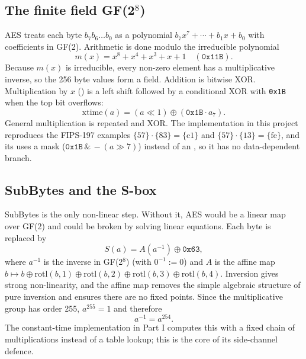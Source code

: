 \subsection{The finite field GF(2\texorpdfstring{$^8$}{8})}

AES treats each byte $b_7 b_6\ldots b_0$ as a polynomial $b_7x^7 + \cdots + b_1x + b_0$ with coefficients in GF(2). Arithmetic is done modulo the irreducible polynomial
\begin{equation}
m(x) = x^8 + x^4 + x^3 + x + 1 \quad (\texttt{0x11B}).
\end{equation}
Because $m(x)$ is irreducible, every non-zero element has a multiplicative inverse, so the 256 byte values form a field. Addition is bitwise XOR. Multiplication by $x$ () is a left shift followed by a conditional XOR with \texttt{0x1B} when the top bit overflows:
\begin{equation}
\mathrm{xtime}(a) = (a \ll 1) \oplus (\texttt{0x1B}\cdot a_7).
\end{equation}
General multiplication is repeated  and XOR. The implementation in this project reproduces the FIPS-197 examples $\{57\}\cdot\{83\} = \{\mathrm{c1}\}$ and $\{57\}\cdot\{13\} = \{\mathrm{fe}\}$, and its  uses a mask ($\texttt{0x1B}\,\&\,{-}(a \gg 7)$) instead of an , so it has no data-dependent branch.

\subsection{SubBytes and the S-box}

SubBytes is the only non-linear step. Without it, AES would be a linear map over GF(2) and could be broken by solving linear equations. Each byte is replaced by
\begin{equation}
S(a) = A\!\left(a^{-1}\right) \oplus \texttt{0x63},
\label{eq:sbox}
\end{equation}
where $a^{-1}$ is the inverse in GF(2$^8$) (with $0^{-1} := 0$) and $A$ is the affine map $b \mapsto b \oplus \mathrm{rotl}(b,1) \oplus \mathrm{rotl}(b,2) \oplus \mathrm{rotl}(b,3) \oplus \mathrm{rotl}(b,4)$. Inversion gives strong non-linearity, and the affine map removes the simple algebraic structure of pure inversion and ensures there are no fixed points. Since the multiplicative group has order 255, $a^{255} = 1$ and therefore
\begin{equation}
a^{-1} = a^{254}.
\end{equation}
The constant-time implementation in Part I computes this with a fixed chain of multiplications instead of a table lookup; this is the core of its side-channel defence.

